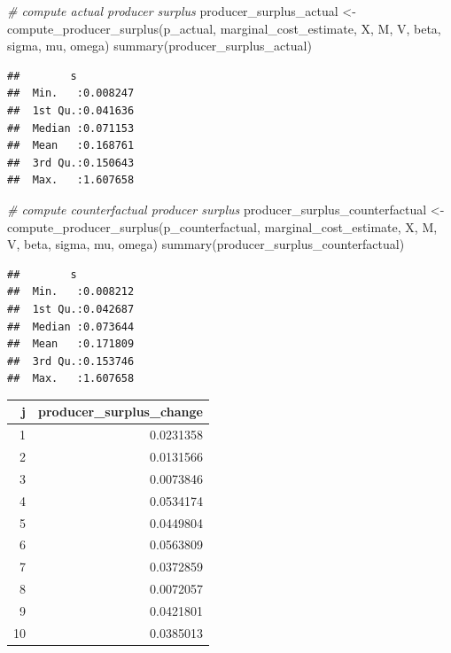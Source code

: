 \documentclass[
]{book}
\newenvironment{Shaded}{\begin{snugshade}}{\end{snugshade}}
\newcommand{\CommentTok}[1]{\textcolor[rgb]{0.56,0.35,0.01}{\textit{#1}}}
\newcommand{\FunctionTok}[1]{\textcolor[rgb]{0.00,0.00,0.00}{#1}}
\newcommand{\NormalTok}[1]{#1}
\newcommand{\OtherTok}[1]{\textcolor[rgb]{0.56,0.35,0.01}{#1}}
\begin{document}
\begin{Shaded}
\begin{Highlighting}[]
\CommentTok{\# compute actual producer surplus}
\NormalTok{producer\_surplus\_actual }\OtherTok{\textless{}{-}}
  \FunctionTok{compute\_producer\_surplus}\NormalTok{(p\_actual, marginal\_cost\_estimate, X, M, V, beta, sigma, mu, omega)}
\FunctionTok{summary}\NormalTok{(producer\_surplus\_actual)}
\end{Highlighting}
\end{Shaded}

\begin{verbatim}
##        s           
##  Min.   :0.008247  
##  1st Qu.:0.041636  
##  Median :0.071153  
##  Mean   :0.168761  
##  3rd Qu.:0.150643  
##  Max.   :1.607658
\end{verbatim}

\begin{Shaded}
\begin{Highlighting}[]
\CommentTok{\# compute counterfactual producer surplus}
\NormalTok{producer\_surplus\_counterfactual }\OtherTok{\textless{}{-}}
  \FunctionTok{compute\_producer\_surplus}\NormalTok{(p\_counterfactual, marginal\_cost\_estimate, X, M, V, beta, sigma, mu, omega)}
\FunctionTok{summary}\NormalTok{(producer\_surplus\_counterfactual)}
\end{Highlighting}
\end{Shaded}

\begin{verbatim}
##        s           
##  Min.   :0.008212  
##  1st Qu.:0.042687  
##  Median :0.073644  
##  Mean   :0.171809  
##  3rd Qu.:0.153746  
##  Max.   :1.607658
\end{verbatim}

\begin{tabular}{r|r}
\hline
j & producer\_surplus\_change\\
\hline
1 & 0.0231358\\
\hline
2 & 0.0131566\\
\hline
3 & 0.0073846\\
\hline
4 & 0.0534174\\
\hline
5 & 0.0449804\\
\hline
6 & 0.0563809\\
\hline
7 & 0.0372859\\
\hline
8 & 0.0072057\\
\hline
9 & 0.0421801\\
\hline
10 & 0.0385013\\
\hline
\end{tabular}
\end{document}
